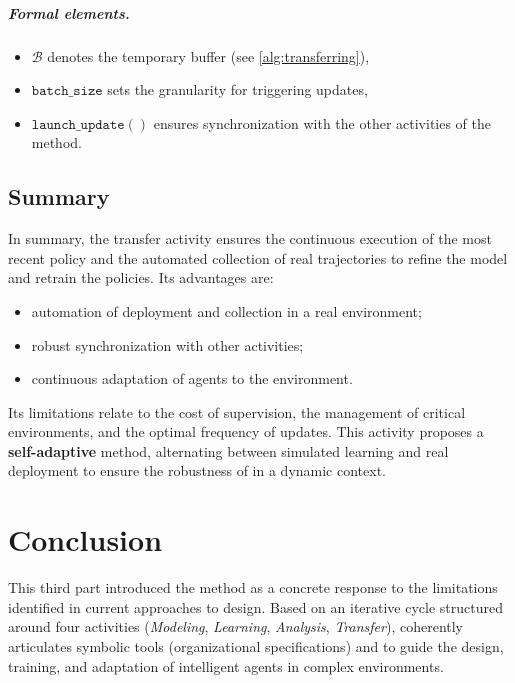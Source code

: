 \begin{itemize}
  \paragraph{Formal elements.}
  \begin{itemize}
  \item $\mathcal{B}$ denotes the temporary buffer (see \autoref{alg:transferring}),
  \item $\texttt{batch\_size}$ sets the granularity for triggering updates,
  \item $\texttt{launch\_update}()$ ensures synchronization with the other activities of the method.
\end {itemize}


\section{Summary}

In summary, the transfer activity ensures the continuous execution of the most recent policy and the automated collection of real trajectories to refine the model and retrain the policies.
%
Its advantages are:
\begin{itemize}
  \item automation of deployment and collection in a real environment;
  \item robust synchronization with other  activities;
  \item continuous adaptation of agents to the environment.
\end{itemize}

Its limitations relate to the cost of supervision, the management of critical environments, and the optimal frequency of updates.
%
This activity proposes a \textbf{self-adaptive} method, alternating between simulated learning and real deployment to ensure the robustness of  in a dynamic context.



\clearpage
\thispagestyle{empty}
\null
\newpage

\chapter*{Conclusion}

\noindent
This third part introduced the \textbf{} method as a concrete response to the limitations identified in current approaches to  design. Based on an iterative cycle structured around four activities (\textit{Modeling}, \textit {Learning}, \textit{Analysis}, \textit{Transfer}),  coherently articulates symbolic tools (organizational specifications) and  to guide the design, training, and adaptation of intelligent agents in complex environments.


\end{itemize}
